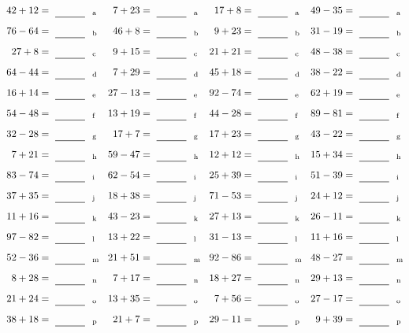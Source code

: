 \documentclass
[
  draft    = true,
  fontsize = 11pt,
  parskip  = half-
]
{scrartcl}
\begin{document}
\clearpage
\begin{align*}
    \pline{42+12}&=\rline{a}
  & \pline{7+23}&=\rline{a}
  & \pline{17+8}&=\rline{a}
  & \pline{49-35}&=\rline{a} \\[1ex]
    \pline{76-64}&=\rline{b}
  & \pline{46+8}&=\rline{b}
  & \pline{9+23}&=\rline{b}
  & \pline{31-19}&=\rline{b} \\[1ex]
    \pline{27+8}&=\rline{c}
  & \pline{9+15}&=\rline{c}
  & \pline{21+21}&=\rline{c}
  & \pline{48-38}&=\rline{c} \\[1ex]
    \pline{64-44}&=\rline{d}
  & \pline{7+29}&=\rline{d}
  & \pline{45+18}&=\rline{d}
  & \pline{38-22}&=\rline{d} \\[1ex]
    \pline{16+14}&=\rline{e}
  & \pline{27-13}&=\rline{e}
  & \pline{92-74}&=\rline{e}
  & \pline{62+19}&=\rline{e} \\[1ex]
    \pline{54-48}&=\rline{f}
  & \pline{13+19}&=\rline{f}
  & \pline{44-28}&=\rline{f}
  & \pline{89-81}&=\rline{f} \\[1ex]
    \pline{32-28}&=\rline{g}
  & \pline{17+7}&=\rline{g}
  & \pline{17+23}&=\rline{g}
  & \pline{43-22}&=\rline{g} \\[1ex]
    \pline{7+21}&=\rline{h}
  & \pline{59-47}&=\rline{h}
  & \pline{12+12}&=\rline{h}
  & \pline{15+34}&=\rline{h} \\[1ex]
    \pline{83-74}&=\rline{i}
  & \pline{62-54}&=\rline{i}
  & \pline{25+39}&=\rline{i}
  & \pline{51-39}&=\rline{i} \\[1ex]
    \pline{37+35}&=\rline{j}
  & \pline{18+38}&=\rline{j}
  & \pline{71-53}&=\rline{j}
  & \pline{24+12}&=\rline{j} \\[1ex]
    \pline{11+16}&=\rline{k}
  & \pline{43-23}&=\rline{k}
  & \pline{27+13}&=\rline{k}
  & \pline{26-11}&=\rline{k} \\[1ex]
    \pline{97-82}&=\rline{l}
  & \pline{13+22}&=\rline{l}
  & \pline{31-13}&=\rline{l}
  & \pline{11+16}&=\rline{l} \\[1ex]
    \pline{52-36}&=\rline{m}
  & \pline{21+51}&=\rline{m}
  & \pline{92-86}&=\rline{m}
  & \pline{48-27}&=\rline{m} \\[1ex]
    \pline{8+28}&=\rline{n}
  & \pline{7+17}&=\rline{n}
  & \pline{18+27}&=\rline{n}
  & \pline{29+13}&=\rline{n} \\[1ex]
    \pline{21+24}&=\rline{o}
  & \pline{13+35}&=\rline{o}
  & \pline{7+56}&=\rline{o}
  & \pline{27-17}&=\rline{o} \\[1ex]
    \pline{38+18}&=\rline{p}
  & \pline{21+7}&=\rline{p}
  & \pline{29-11}&=\rline{p}
  & \pline{9+39}&=\rline{p}
\end{align*}
\end{document}
